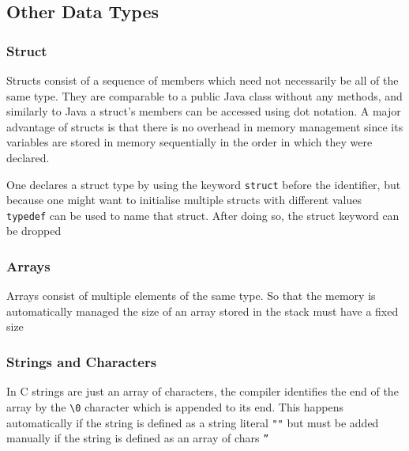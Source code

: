 \subsection{Other Data Types}

\subsubsection{Struct}
\par{Structs consist of a sequence of members which need not necessarily be all of the same
type. They are comparable to a public Java class without any methods, and similarly to Java a
struct's members can be accessed using dot notation. A major advantage of structs is that there is
no overhead in memory management since its variables are stored in memory sequentially in the order
in which they were declared.}
\par{One declares a struct type by using the keyword \texttt{struct} before the identifier, but
because one might want to initialise multiple structs with different values \texttt{typedef} can be
used to name that struct. After doing so, the struct keyword can be dropped}

\subsubsection{Arrays}
\par{Arrays consist of multiple elements of the same type. So that the memory is automatically
managed the size of an array stored in the stack  must have a fixed size }



\subsubsection{Strings and Characters}

\par{In C strings are just an array of characters, the compiler identifies the end of the array
by the \texttt{\textbackslash0} character which is appended to its end. This happens automatically if the string is defined as a string literal \texttt{""} but must be added manually if the string is defined as an array of chars \texttt{''}}

